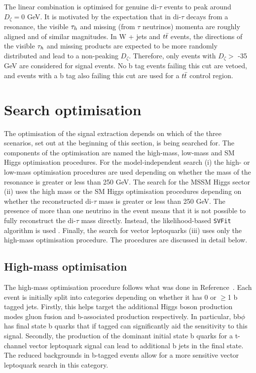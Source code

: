 The linear combination is optimised for genuine di-$\tau$ events to peak around $D_{\zeta} = 0$ GeV. 
It is motivated by the expectation that in di-$\tau$ decays from a resonance, the visible $\tau_{h}$ and missing (from $\tau$ neutrinos) momenta are roughly aligned and of similar magnitudes.
In W + jets and $t\bar{t}$ events, the directions of the visible $\tau_{h}$ and missing products are expected to be more randomly distributed and lead to a non-peaking $D_{\zeta}$.
Therefore, only events with $D_\zeta >$ -35 GeV are considered for signal events.
No b tag events failing this cut are vetoed, and events with a b tag also failing this cut are used for a $t\bar{t}$ control region.

\section{Search optimisation}
\label{sec:search_optimisation}

The optimisation of the signal extraction depends on which of the three scenarios, set out at the beginning of this section, is being searched for.
The components of the optimisation are named the high-mass, low-mass and \ac{SM} Higgs optimisation procedures.
For the model-independent search (i) the high- or low-mass optimisation procedures are used depending on whether the mass of the resonance is greater or less than 250 GeV.
The search for the \ac{MSSM} Higgs sector (ii) uses the high mass or the \ac{SM} Higgs optimisation procedures depending on whether the reconstructed di-$\tau$ mass is greater or less than 250 GeV.
The presence of more than one neutrino in the event means that it is not possible to fully reconstruct the di-$\tau$ mass directly.
Instead, the likelihood-based \texttt{SVFit} algorithm is used \cite{Bianchini:2014vza}.
Finally, the search for vector leptoquarks (iii) uses only the high-mass optimisation procedure.
The procedures are discussed in detail below. \\

\subsection{High-mass optimisation}
\label{sec:high_mass_optimisation}

The high-mass optimisation procedure follows what was done in Reference~\cite{CMS_MSSM_Tau_2018}.
Each event is initially split into categories depending on whether it has 0 or $\geq$1 b tagged jets.
Firstly, this helps target the additional Higgs boson production modes gluon fusion and b-associated production respectively.
In particular, bb$\phi$ has final state b quarks that if tagged can significantly aid the sensitivity to this signal.
Secondly, the production of the dominant initial state b quarks for a t-channel vector leptoquark signal can lead to additional b jets in the final state.
The reduced backgrounds in b-tagged events allow for a more sensitive vector leptoquark search in this category. \\

